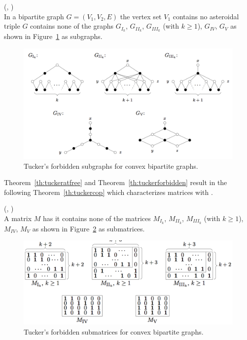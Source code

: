 \begin{theorem}
  (\cite[Th.~7]{at72}, \cite[Th.~2.4]{d08phd})\\
  In a bipartite graph $G = (V_1, V_2, E)$ the vertex set $V_1$
  contains no asteroidal triple \iff $G$ contains none of the graphs
  $G_{I_k}$, $G_{II_k}$, $G_{III_k}$ (with $k \ge 1$), $G_{IV}$,
  $G_{V}$ as shown in Figure~\ref{fig:forbiddensubgraphs} as subgraphs.
  \label{th:tuckerforbidden}
\end{theorem}


\begin{figure}[htbp]
  \centering
  \includegraphics[scale=0.35]{../img/tuckersforbiddensubgraphs.png}  
  \caption[\figtabsize Tucker's forbidden subgraphs]{\figtabsize Tucker's
    forbidden subgraphs for convex bipartite graphs. } 
  \label{fig:forbiddensubgraphs}
\end{figure}

Theorem~\ref{th:tuckeratfree} and Theorem~\ref{th:tuckerforbidden}
result in the following Theorem~\ref{th:tuckercop} which characterizes
matrices with \COP.

\begin{theorem}
  (\cite[Th.~9]{at72}, \cite[Th.~2.5]{d08phd})\\
  A matrix $M$ has \COP \iff it contains none of the matrices 
$M_{I_k}$, $M_{II_k}$, $M_{III_k}$ (with $k \ge 1$), $M_{IV}$,
  $M_{V}$ as shown in Figure~\ref{fig:forbiddensubmatrices} as submatrices.
  \label{th:tuckercop}
\end{theorem}

\begin{figure}[htbp]
  \centering
  \includegraphics[scale=0.35]{../img/tuckersforbiddensubmatrices.png}  
  \caption[\figtabsize Tucker's forbidden submatrices]{\figtabsize Tucker's
    forbidden submatrices for convex bipartite graphs. } 
  \label{fig:forbiddensubmatrices}
\end{figure}

